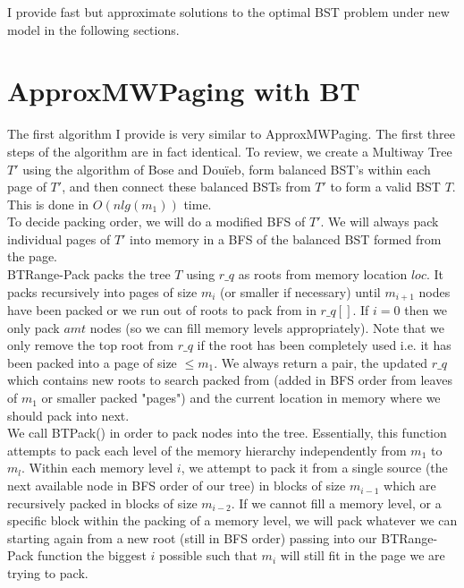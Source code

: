 \documentclass[letterpaper,12pt,titlepage,oneside,final]{book}
\theoremstyle{plain}
\begin{document}
I provide fast but approximate solutions to the optimal BST problem under new model in the following sections.

\section{ApproxMWPaging with BT}

The first algorithm I provide is very similar to ApproxMWPaging. The first three steps of the algorithm are in fact identical. To review, we create a Multiway Tree $T'$ using the algorithm of Bose and Dou\"{i}eb, form balanced BST's within each page of $T'$, and then connect these balanced BSTs from $T'$ to form a valid BST $T$. This is done in $O(n lg(m_1))$ time. \\

To decide packing order, we will do a modified BFS of $T'$. We will always pack individual pages of $T'$ into memory in a BFS of the balanced BST formed from the page. \\

BT\textendash Range-Pack packs the tree $T$ using $r\_q$ as roots from memory location $loc$. It packs recursively into pages of size $m_i$ (or smaller if necessary) until $m_{i+1}$ nodes have been packed or we run out of roots to pack from in $r\_q[]$. If $i=0$ then we only pack $amt$ nodes (so we can fill memory levels appropriately). Note that we only remove the top root from $r\_q$ if the root has been completely used i.e. it has been packed into a page of size $\leq m_1$. We always return a pair, the updated $r\_q$ which contains new roots to search packed from (added in BFS order from leaves of $m_1$ or smaller packed "pages") and the current location in memory where we should pack into next. \\

We call BT\textendash Pack() in order to pack nodes into the tree. Essentially, this function attempts to pack each level of the memory hierarchy independently from $m_1$ to $m_l$. Within each memory level $i$, we attempt to pack it from a single source (the next available node in BFS order of our tree) in blocks of size  $m_{i-1}$ which are recursively packed in blocks of size $m_{i-2}$. If we cannot fill a memory level, or a specific block within the packing of a memory level, we will pack whatever we can starting again from a new root (still in BFS order) passing into our BT\textendash Range-Pack function the biggest $i$ possible such that $m_i$ will still fit in the page we are trying to pack. \\
\end{document}
